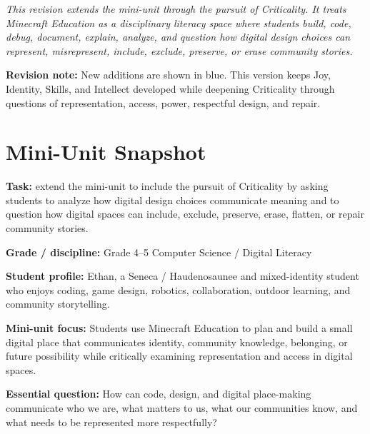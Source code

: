\begin{titlepage}
\vspace{0.34in}

\begin{center}
\begin{minipage}{0.86\textwidth}
\itshape
This revision extends the mini-unit through the pursuit of Criticality. It treats Minecraft Education as a disciplinary literacy space where students build, code, debug, document, explain, analyze, and question how digital design choices can represent, misrepresent, include, exclude, preserve, or erase community stories.

\vspace{0.22in}

\scriptsize\centering\textbf{Revision note:} New additions are shown in \textcolor{LessonTwoAccent}{blue}. This version keeps Joy, Identity, Skills, and Intellect developed while deepening Criticality through questions of representation, access, power, respectful design, and repair.
\end{minipage}
\end{center}

\restoregeometry
\end{titlepage}
\clearpage
\onehalfspacing

\section*{Mini-Unit Snapshot}

\textbf{Task:} extend the mini-unit to include the pursuit of Criticality by asking students to analyze how digital design choices communicate meaning and to question how digital spaces can include, exclude, preserve, erase, flatten, or repair community stories.

\textbf{Grade / discipline:} Grade 4--5 Computer Science / Digital Literacy

\textbf{Student profile:} Ethan, a Seneca / Haudenosaunee and mixed-identity student who enjoys coding, game design, robotics, collaboration, outdoor learning, and community storytelling.

\textbf{Mini-unit focus:} Students use Minecraft Education to plan and build a small digital place that communicates identity, community knowledge, belonging, or future possibility while critically examining representation and access in digital spaces.

\textbf{Essential question:} How can code, design, and digital place-making communicate who we are, what matters to us, what our communities know, and what needs to be represented more respectfully?

